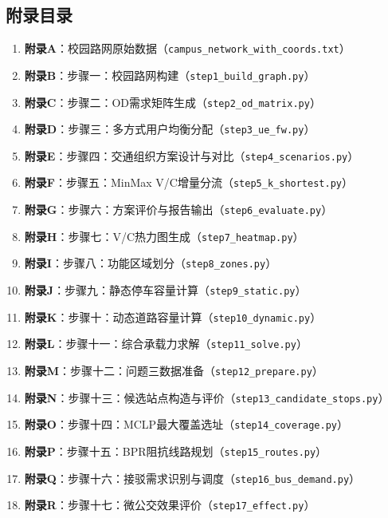 \documentclass[UTF8,zihao=-4,a4paper]{ctexart}
\numberwithin{table}{section}
\numberwithin{figure}{section}
\numberwithin{equation}{section}
\begin{document}
\subsection*{附录目录}
\begin{enumerate}[leftmargin=3em]
  \item \textbf{附录A}：校园路网原始数据（\texttt{campus\_network\_with\_coords.txt}）
  \item \textbf{附录B}：步骤一：校园路网构建（\texttt{step1\_build\_graph.py}）
  \item \textbf{附录C}：步骤二：OD需求矩阵生成（\texttt{step2\_od\_matrix.py}）
  \item \textbf{附录D}：步骤三：多方式用户均衡分配（\texttt{step3\_ue\_fw.py}）
  \item \textbf{附录E}：步骤四：交通组织方案设计与对比（\texttt{step4\_scenarios.py}）
  \item \textbf{附录F}：步骤五：MinMax V/C增量分流（\texttt{step5\_k\_shortest.py}）
  \item \textbf{附录G}：步骤六：方案评价与报告输出（\texttt{step6\_evaluate.py}）
  \item \textbf{附录H}：步骤七：V/C热力图生成（\texttt{step7\_heatmap.py}）
  \item \textbf{附录I}：步骤八：功能区域划分（\texttt{step8\_zones.py}）
  \item \textbf{附录J}：步骤九：静态停车容量计算（\texttt{step9\_static.py}）
  \item \textbf{附录K}：步骤十：动态道路容量计算（\texttt{step10\_dynamic.py}）
  \item \textbf{附录L}：步骤十一：综合承载力求解（\texttt{step11\_solve.py}）
  \item \textbf{附录M}：步骤十二：问题三数据准备（\texttt{step12\_prepare.py}）
  \item \textbf{附录N}：步骤十三：候选站点构造与评价（\texttt{step13\_candidate\_stops.py}）
  \item \textbf{附录O}：步骤十四：MCLP最大覆盖选址（\texttt{step14\_coverage.py}）
  \item \textbf{附录P}：步骤十五：BPR阻抗线路规划（\texttt{step15\_routes.py}）
  \item \textbf{附录Q}：步骤十六：接驳需求识别与调度（\texttt{step16\_bus\_demand.py}）
  \item \textbf{附录R}：步骤十七：微公交效果评价（\texttt{step17\_effect.py}）
\end{enumerate}

\end{document}
